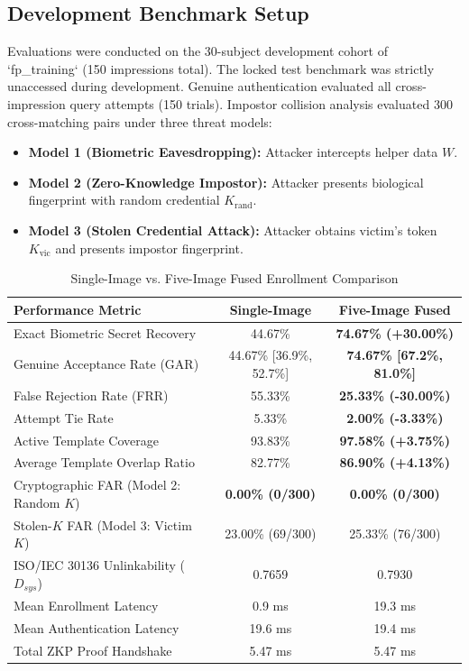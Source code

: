 \documentclass[conference]{IEEEtran}
\begin{document}
\subsection{Development Benchmark Setup}
Evaluations were conducted on the 30-subject development cohort of `fp_training` (150 impressions total). The locked test benchmark was strictly unaccessed during development. Genuine authentication evaluated all cross-impression query attempts (150 trials). Impostor collision analysis evaluated 300 cross-matching pairs under three threat models:
\begin{itemize}
    \item \textbf{Model 1 (Biometric Eavesdropping):} Attacker intercepts helper data $W$.
    \item \textbf{Model 2 (Zero-Knowledge Impostor):} Attacker presents biological fingerprint with random credential $K_{\text{rand}}$.
    \item \textbf{Model 3 (Stolen Credential Attack):} Attacker obtains victim's token $K_{\text{vic}}$ and presents impostor fingerprint.
\end{itemize}

\begin{table}[htbp]
\caption{Single-Image vs. Five-Image Fused Enrollment Comparison}
\centering
\begin{tabular}{lcc}
\toprule
\textbf{Performance Metric} & \textbf{Single-Image} & \textbf{Five-Image Fused} \\
\midrule
Exact Biometric Secret Recovery & 44.67\% & \textbf{74.67\% (+30.00\%)} \\
Genuine Acceptance Rate (GAR) & 44.67\% [36.9\%, 52.7\%] & \textbf{74.67\% [67.2\%, 81.0\%]} \\
False Rejection Rate (FRR) & 55.33\% & \textbf{25.33\% (-30.00\%)} \\
Attempt Tie Rate & 5.33\% & \textbf{2.00\% (-3.33\%)} \\
Active Template Coverage & 93.83\% & \textbf{97.58\% (+3.75\%)} \\
Average Template Overlap Ratio & 82.77\% & \textbf{86.90\% (+4.13\%)} \\
\midrule
Cryptographic FAR (Model 2: Random $K$) & \textbf{0.00\% (0/300)} & \textbf{0.00\% (0/300)} \\
Stolen-$K$ FAR (Model 3: Victim $K$) & 23.00\% (69/300) & 25.33\% (76/300) \\
ISO/IEC 30136 Unlinkability ($D_{sys}$) & 0.7659 & 0.7930 \\
\midrule
Mean Enrollment Latency & 0.9 ms & 19.3 ms \\
Mean Authentication Latency & 19.6 ms & 19.4 ms \\
Total ZKP Proof Handshake & 5.47 ms & 5.47 ms \\
\bottomrule
\end{tabular}
\label{tab:comparison}
\end{table}
\end{document}
